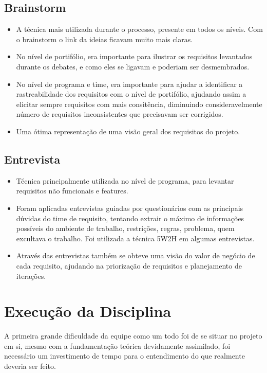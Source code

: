 \subsection{Brainstorm}
\begin{itemize}
\item A técnica mais utilizada durante o processo, presente em todos os níveis. Com o brainstorm o link da ideias ficavam muito mais claras.
\item No nível de portifólio, era importante para ilustrar os requisitos levantados durante os debates, e como eles se ligavam e poderiam ser desmembrados.
\item No nível de programa e time, era importante para ajudar a identificar a rastreabilidade dos requisitos com o nível de portifólio, ajudando assim a elicitar sempre requisitos com mais consitência, diminuindo consideravelmente número de requisitos inconsistentes que precisavam ser corrigidos.
\item Uma ótima representação de uma visão geral dos requisitos do projeto.
\end{itemize}

\subsection{Entrevista}
\begin{itemize}
\item Técnica principalmente utilizada no nível de programa, para levantar requisitos não funcionais e features.
\item Foram aplicadas entrevistas  guiadas por questionários  com as principais dúvidas do time de requisito, tentando extrair o máximo de informações possíveis do ambiente de trabalho, restrições, regras, problema, quem excultava o trabalho. Foi utilizada a técnica 5W2H\cite{wh} em algumas entrevistas.
\item Através das entrevistas também se obteve uma visão do valor de negócio de cada requisito, ajudando na priorização de requisitos e planejamento de iterações.
\end{itemize}


\section{Execução da Disciplina}

A primeira grande dificuldade da equipe como um todo foi de se situar no projeto em si,
mesmo com a fundamentação teórica devidamente assimilado, foi necessário um investimento
de tempo para o entendimento do que realmente deveria ser feito.

